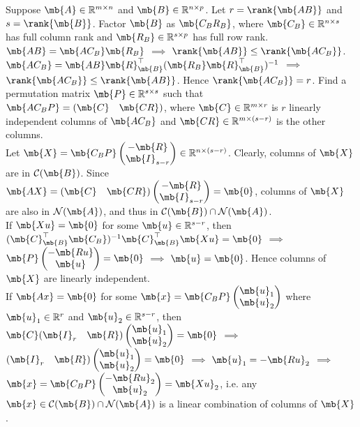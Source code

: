 \begin{exercise}
\begin{enumerate}
			\begin{solution}
				Suppose $\mb{A} \in \mathbb{R}^{m\times n}$ and $\mb{B}\in \mathbb{R}^{n\times p}$. Let $r=\rank{\mb{AB}}$ and $s=\rank{\mb{B}}$.
				Factor $\mb{B}$ as $\mb{C_B R_B}$, where $\mb{C_B}\in \mathbb{R}^{n\times s}$ has full column rank and $\mb{R_B}\in \mathbb{R}^{s\times p}$ has full row rank.
				$\mb{AB}=\mb{A C_B}\mb{R_B}$ $\implies$ $\rank{\mb{AB}} \leq \rank{\mb{A C_B}}$.
				$\mb{A C_B}=\mb{A B}\mb{R}_\mb{B}^\top(\mb{R_B}\mb{R}_\mb{B}^\top)^{-1}$ $\implies$ $\rank{\mb{A C_B}} \leq \rank{\mb{AB}}$.
				Hence $\rank{\mb{A C_B}} = r$.
				Find a permutation matrix $\mb{P}\in \mathbb{R}^{s\times s}$ such that $\mb{AC_B P}=(\mb{C}\quad\mb{CR})$, where $\mb{C}\in \mathbb{R}^{m\times r}$ is $r$ linearly independent columns of $\mb{AC_B}$ and $\mb{CR}\in \mathbb{R}^{m\times (s-r)}$ is the other columns.
				\\
				Let $\mb{X}=\mb{C_B P}\begin{pmatrix} -\mb{R} \\ \mb{I}_{s-r} \end{pmatrix}\in \mathbb{R}^{n\times (s-r)}$.
				Clearly, columns of $\mb{X}$ are in $\mathcal{C}(\mb{B })$.
				Since $\mb{AX}=(\mb{C}\quad\mb{CR})\begin{pmatrix} -\mb{R} \\ \mb{I}_{s-r} \end{pmatrix}=\mb{0}$, columns of $\mb{X}$ are also in $\mathcal{N}(\mb{A})$, and thus in $\mathcal{C}(\mb{B })\cap \mathcal{N}(\mb{A})$.
				\\
				If $\mb{Xu}=\mb{0}$ for some $\mb{u}\in \mathbb{R}^{s-r}$, then $(\mb{C}_\mb{B}^\top\mb{C_B})^{-1}\mb{C}_\mb{B}^\top \mb{Xu}=\mb{0}$ $\implies$ $\mb{P}\begin{pmatrix} -\mb{Ru} \\ \mb{u} \end{pmatrix} = \mb{0}$ $\implies$ $\mb{u}=\mb{0}$.
				Hence columns of $\mb{X}$ are linearly independent.
				\\
				If $\mb{Ax}=\mb{0} $ for some $\mb{x}=\mb{C_B P}\begin{pmatrix} \mb{u}_1 \\ \mb{u}_2 \end{pmatrix}$ where $\mb{u}_1\in \mathbb{R}^r$ and $\mb{u}_2\in\mathbb{R}^{s-r}$, then $\mb{C}(\mb{I}_r\quad\mb{R}) \begin{pmatrix} \mb{u}_1 \\ \mb{u}_2 \end{pmatrix} = \mb{0}$ $\implies$ $(\mb{I}_r\quad\mb{R}) \begin{pmatrix} \mb{u}_1 \\ \mb{u}_2 \end{pmatrix} = \mb{0}$ $\implies$ $\mb{u}_1 = -\mb{Ru}_2$ $\implies$ $\mb{x}=\mb{C_B P}\begin{pmatrix} -\mb{Ru}_2 \\ \mb{u}_2 \end{pmatrix}=\mb{Xu}_2$, i.e. any $\mb{x}\in\mathcal{C}(\mb{B })\cap \mathcal{N}(\mb{A})$ is a linear combination of columns of $\mb{X}$.

\end{solution}
\end{enumerate}
\end{exercise}
